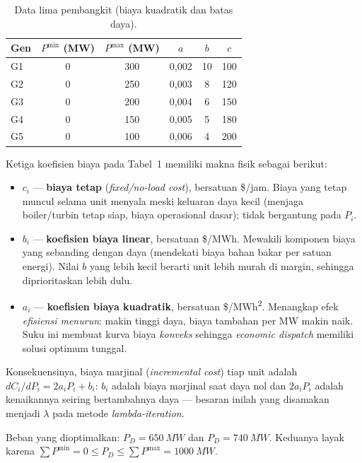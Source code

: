 \documentclass[11pt,a4paper]{article}
\begin{document}
\begin{table}[h]
\centering
\caption{Data lima pembangkit (biaya kuadratik dan batas daya).}
\begin{tabular}{lccccc}
\toprule
Gen & $P^{\min}$ (MW) & $P^{\max}$ (MW) & $a$ & $b$ & $c$ \\
\midrule
G1 & 0 & 300 & 0,002 & 10 & 100 \\
G2 & 0 & 250 & 0,003 & 8  & 120 \\
G3 & 0 & 200 & 0,004 & 6  & 150 \\
G4 & 0 & 150 & 0,005 & 5  & 180 \\
G5 & 0 & 100 & 0,006 & 4  & 200 \\
\bottomrule
\end{tabular}
\end{table}

Ketiga koefisien biaya pada Tabel~1 memiliki makna fisik sebagai berikut:
\begin{itemize}
  \item $c_i$ --- \textbf{biaya tetap} (\emph{fixed/no-load cost}), bersatuan \si{\$/jam}.
  Biaya yang tetap muncul selama unit menyala meski keluaran daya kecil (menjaga
  boiler/turbin tetap siap, biaya operasional dasar); tidak bergantung pada $P_i$.
  \item $b_i$ --- \textbf{koefisien biaya linear}, bersatuan \si{\$/MWh}. Mewakili
  komponen biaya yang sebanding dengan daya (mendekati biaya bahan bakar per satuan
  energi). Nilai $b$ yang lebih kecil berarti unit lebih murah di margin, sehingga
  diprioritaskan lebih dulu.
  \item $a_i$ --- \textbf{koefisien biaya kuadratik}, bersatuan \si{\$/MWh\squared}.
  Menangkap efek \emph{efisiensi menurun}: makin tinggi daya, biaya tambahan per MW
  makin naik. Suku ini membuat kurva biaya \emph{konveks} sehingga \emph{economic
  dispatch} memiliki solusi optimum tunggal.
\end{itemize}

Konsekuensinya, biaya marjinal (\emph{incremental cost}) tiap unit adalah
$dC_i/dP_i = 2a_i P_i + b_i$: $b_i$ adalah biaya marjinal saat daya nol dan $2a_i P_i$
adalah kenaikannya seiring bertambahnya daya --- besaran inilah yang disamakan
menjadi $\lambda$ pada metode \emph{lambda-iteration}.

Beban yang dioptimalkan: $P_D = \SI{650}{MW}$ dan $P_D = \SI{740}{MW}$.
Keduanya layak karena $\sum P^{\min}=0 \le P_D \le \sum P^{\max}=\SI{1000}{MW}$.
\end{document}
